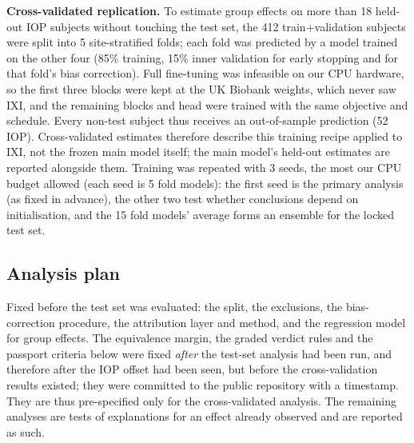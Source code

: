 \documentclass[conference]{IEEEtran}
\begin{document}
\textbf{Cross-validated replication.} To estimate group effects on more than 18 held-out IOP subjects without touching the test set, the 412 train+validation subjects were split into 5 site-stratified folds; each fold was predicted by a model trained on the other four (85\% training, 15\% inner validation for early stopping and for that fold's bias correction). Full fine-tuning was infeasible on our CPU hardware, so the first three blocks were kept at the UK Biobank weights, which never saw IXI, and the remaining blocks and head were trained with the same objective and schedule. Every non-test subject thus receives an out-of-sample prediction (52 IOP). Cross-validated estimates therefore describe this training recipe applied to IXI, not the frozen main model itself; the main model's held-out estimates are reported alongside them. Training was repeated with 3 seeds, the most our CPU budget allowed (each seed is 5 fold models): the first seed is the primary analysis (as fixed in advance), the other two test whether conclusions depend on initialisation, and the 15 fold models' average forms an ensemble for the locked test set.

\subsection{Analysis plan}
Fixed before the test set was evaluated: the split, the exclusions, the bias-correction procedure, the attribution layer and method, and the regression model for group effects. The equivalence margin, the graded verdict rules and the passport criteria below were fixed \emph{after} the test-set analysis had been run, and therefore after the IOP offset had been seen, but before the cross-validation results existed; they were committed to the public repository with a timestamp. They are thus pre-specified only for the cross-validated analysis. The remaining analyses are tests of explanations for an effect already observed and are reported as such.
\end{document}
